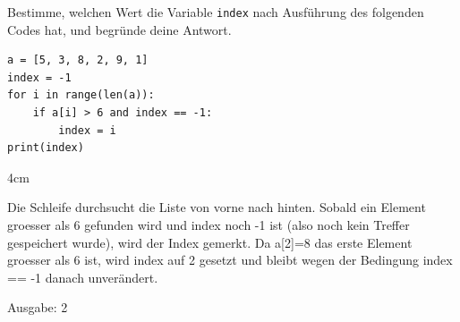 \question[4]
Bestimme, welchen Wert die Variable \texttt{index} nach Ausführung des folgenden Codes hat,
 und begründe deine Antwort.
\begin{lstlisting}
a = [5, 3, 8, 2, 9, 1]
index = -1
for i in range(len(a)):
    if a[i] > 6 and index == -1:
        index = i
print(index)
\end{lstlisting}

\begin{solutionbox}{4cm}

Die Schleife durchsucht die Liste von vorne nach hinten. Sobald
ein Element groesser als 6 gefunden wird und index noch -1 ist
(also noch kein Treffer gespeichert wurde), wird der Index
gemerkt. Da a[2]=8 das erste Element groesser als 6 ist, wird
index auf 2 gesetzt und bleibt wegen der Bedingung index == -1
danach unverändert.

Ausgabe: 2

\end{solutionbox}